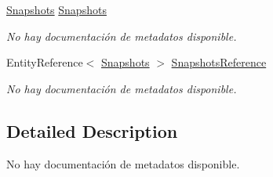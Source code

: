 \begin{DoxyCompactItemize}
\hyperlink{class_microsoft_1_1_samples_1_1_kinect_1_1_basic_interactions_1_1_snapshots}{Snapshots} \hyperlink{class_microsoft_1_1_samples_1_1_kinect_1_1_basic_interactions_1_1_interactions_a82c1b58f031be17eadcc81f4e70f7d62}{Snapshots}
\begin{DoxyCompactList}\small\item\em No hay documentación de metadatos disponible. \end{DoxyCompactList}\item 
Entity\-Reference$<$ \hyperlink{class_microsoft_1_1_samples_1_1_kinect_1_1_basic_interactions_1_1_snapshots}{Snapshots} $>$ \hyperlink{class_microsoft_1_1_samples_1_1_kinect_1_1_basic_interactions_1_1_interactions_aebfcd7297fe04c43588b33dff3206ab2}{Snapshots\-Reference}
\begin{DoxyCompactList}\small\item\em No hay documentación de metadatos disponible. \end{DoxyCompactList}\end{DoxyCompactItemize}


\subsection{Detailed Description}
No hay documentación de metadatos disponible. 



